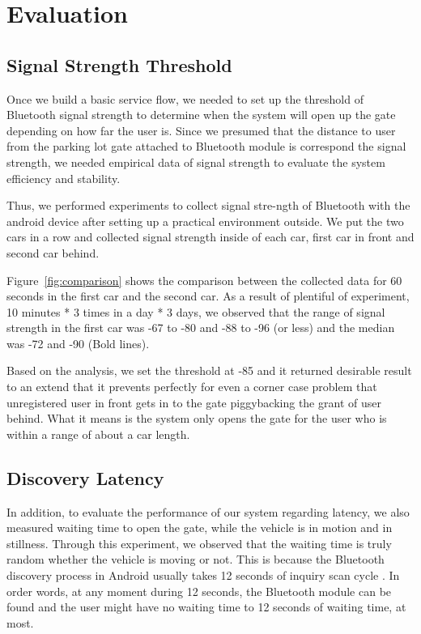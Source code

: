 \section{Evaluation}
\subsection{Signal Strength Threshold}
Once we build a basic service flow, we needed to set up the threshold of Bluetooth signal strength to determine when the system will open up the gate depending on how far the user is. Since we presumed that the distance to user from the parking lot gate attached to Bluetooth module is correspond the signal strength, we needed empirical data of signal strength to evaluate the system efficiency and stability.

Thus, we performed experiments to collect signal stre-ngth of Bluetooth with the android device after setting up a practical environment outside. We put the two cars in a row and collected signal strength inside of each car, first car in front and second car behind.

Figure~\ref{fig:comparison} shows the comparison between the collected data for 60 seconds in the first car and the second car. As a result of plentiful of experiment, 10 minutes * 3 times in a day * 3 days, we observed that the range of signal strength in the first car was -67 to -80 and -88 to -96 (or less) and the median was -72 and -90 (Bold lines).

Based on the analysis, we set the threshold at -85 and it returned desirable result to an extend that it prevents perfectly for even a corner case problem that unregistered user in front gets in to the gate piggybacking the grant of user behind. What it means is the system only opens the gate for the user who is within a range of about a car length.
\subsection{Discovery Latency}
In addition, to evaluate the performance of our system regarding latency, we also measured waiting time to open the gate, while the vehicle is in motion and in stillness. Through this experiment, we observed that the waiting time is truly random whether the vehicle is moving or not. This is because the Bluetooth discovery process in Android usually takes 12 seconds of inquiry scan cycle \cite {btcycle}. In order words, at any moment during 12 seconds, the Bluetooth module can be found and the user might have no waiting time to 12 seconds of waiting time, at most.

